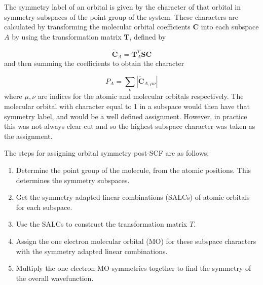 The symmetry label of an orbital is given by the character of that orbital in symmetry
subspaces of the point group of the system. These characters are calculated by transforming
the molecular orbital coefficients $\mathbf{C}$ into each subspace $A$ by using
the transformation matrix $\mathbf{T}$, defined by

\begin{equation}
\tilde{\mathbf{C}}_A = \mathbf{T}^T_A \mathbf{S} \mathbf{C}
\end{equation}
%
and then summing the coefficients to obtain the character

\begin{equation}
P_A = \sum_{\nu} \left\lvert \tilde{\mathbf{C}}_{A, \mu\nu} \right\rvert
\end{equation}
%
where $\mu,\nu$ are indices for the atomic and molecular orbitals respectively. 
The molecular orbital with character equal to 1 in a subspace would then have that
symmetry label, and would be a well defined assignment. However, in practice this was
not always clear cut and so the highest subspace character was taken as the assignment.

The steps for assigning orbital symmetry post-SCF are as follows:

\begin{enumerate}
    \item Determine the point group of the molecule, from the atomic positions. This
    determines the symmetry subspaces.
    \item Get the symmetry adapted linear combinations (SALCs) of atomic orbitals for 
    each subspace.
    \item Use the SALCs to construct the transformation matrix $T$.
    \item Assign the one electron molecular orbital (MO) for these subspace characters
     with the symmetry adapted linear combinations.
    \item Multiply the one electron MO symmetries together to find the symmetry 
    of the overall wavefunction.
\end{enumerate}

